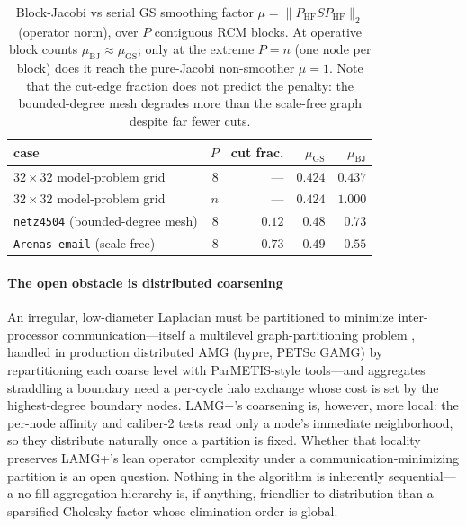 \documentclass[review]{siamart220329}
\begin{document}
\begin{table}[t]\centering
\caption{Block-Jacobi vs serial GS smoothing factor $\mu=\|P_{\mathrm{HF}}SP_{\mathrm{HF}}\|_2$
(operator norm), over $P$ contiguous RCM blocks. At operative block counts
$\mu_{\mathrm{BJ}}\approx\mu_{\mathrm{GS}}$; only at the extreme $P{=}n$ (one node per block) does it
reach the pure-Jacobi non-smoother $\mu{=}1$. Note that the cut-edge fraction does not predict the penalty: the
bounded-degree mesh degrades more than the scale-free graph despite far fewer cuts.}\label{tab:smooth}
\begin{tabular}{lrrrr}
\toprule
case & $P$ & cut frac. & $\mu_{\mathrm{GS}}$ & $\mu_{\mathrm{BJ}}$\\
\midrule
$32\times32$ model-problem grid         & $8$  & ---    & $0.424$ & $0.437$\\
$32\times32$ model-problem grid         & $n$  & ---    & $0.424$ & $1.000$\\
\texttt{netz4504} (bounded-degree mesh) & $8$  & $0.12$ & $0.48$  & $0.73$\\
\texttt{Arenas-email} (scale-free)      & $8$  & $0.73$ & $0.49$  & $0.55$\\
\bottomrule
\end{tabular}
\end{table}

\paragraph{The open obstacle is distributed coarsening} An irregular, low-diameter Laplacian must be
partitioned to minimize inter-processor communication---itself a multilevel graph-partitioning problem
\cite{metis}, handled in production distributed AMG (hypre, PETSc GAMG) by repartitioning each coarse
level with ParMETIS-style tools---and aggregates straddling a boundary need a per-cycle halo exchange
whose cost is set by the highest-degree boundary nodes. LAMG+'s coarsening is, however, more local: the
per-node affinity and caliber-2 tests read only a node's immediate neighborhood, so they distribute
naturally once a partition is fixed. Whether that locality preserves LAMG+'s lean operator complexity
under a communication-minimizing partition is an open question. Nothing in the algorithm is inherently sequential---a no-fill aggregation hierarchy
is, if anything, friendlier to distribution than a sparsified Cholesky factor whose elimination order
is global.
\end{document}
